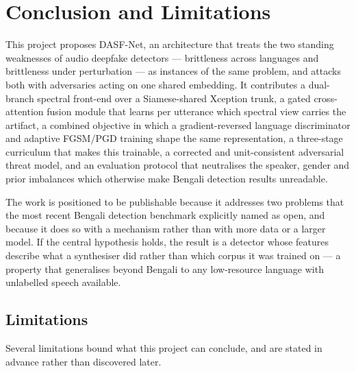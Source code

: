 \documentclass[conference]{IEEEtran}
\renewcommand{\cite}[1]{\unskip}
\begin{document}
\section{Conclusion and Limitations}
This project proposes DASF-Net, an architecture that treats the two standing
weaknesses of audio deepfake detectors --- brittleness across languages and
brittleness under perturbation --- as instances of the same problem, and
attacks both with adversaries acting on one shared embedding. It contributes a
dual-branch spectral front-end over a Siamese-shared Xception trunk, a gated
cross-attention fusion module that learns per utterance which spectral view
carries the artifact, a combined objective in which a gradient-reversed
language discriminator and adaptive FGSM/PGD training shape the same
representation, a three-stage curriculum that makes this trainable, a
corrected and unit-consistent adversarial threat model, and an evaluation
protocol that neutralises the speaker, gender and prior imbalances which
otherwise make Bengali detection results unreadable.

The work is positioned to be publishable because it addresses two problems
that the most recent Bengali detection benchmark \cite{samu2025zeroshot}
explicitly named as open, and because it does so with a mechanism rather than
with more data or a larger model. If the central hypothesis holds, the result
is a detector whose features describe what a synthesiser did rather than which
corpus it was trained on --- a property that generalises beyond Bengali to any
low-resource language with unlabelled speech available.

\subsection{Limitations}
Several limitations bound what this project can conclude, and are stated in
advance rather than discovered later.
\end{document}
